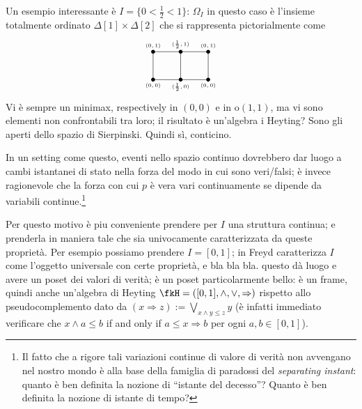 \begin{remark}
  Un esempio interessante è $I=\{0<\frac{1}{2}< 1\}$: $\Omega_I$ in questo caso è l'insieme totalmente ordinato $\Delta[1]\times\Delta[2]$ che si rappresenta pictorialmente come 
  \[\begin{tikzpicture}[xscale=2]
    \foreach \i/\name in {0/0,.5/{\frac{1}{2}},1/0}{
      \foreach \j/\pos in {0/below,1/above}
        \fill (\i,\j) ellipse (1pt and 2pt) node[\pos] {\tiny $(\name,\j)$};
    }
    \draw (0,0) rectangle (1,1);
    \draw (.5,1) -- (.5,0);
    \end{tikzpicture}\]
  Vi è sempre un minimax, respectively in $(0,0)$ e in o$(1,1)$, ma vi sono elementi non confrontabili tra loro; il risultato è un'algebra i Heyting? Sono gli aperti dello spazio di Sierpinski. Quindi sì, conticino.
  
  In un setting come questo, eventi nello spazio continuo dovrebbero dar luogo a cambi istantanei di stato nella forza del modo in cui sono veri/falsi; è invece ragionevole che la forza con cui $p$ è vera vari continuamente se dipende da variabili continue.\footnote{Il fatto che a rigore tali variazioni continue di valore di verità non avvengano nel nostro mondo è alla base della famiglia di paradossi del \emph{separating instant}: quanto è ben definita la nozione di ``istante del decesso''? Quanto è ben definita la nozione di istante di tempo?}

  Per questo motivo è piu conveniente prendere per $I$ una struttura continua; e prenderla in maniera tale che sia univocamente caratterizzata da queste proprietà. Per esempio possiamo prendere $I=[0,1]$; in \cite{} Freyd caratterizza $I$ come l'oggetto universale con certe proprietà, e bla bla bla. questo dà luogo e avere un poset dei valori di verità; è un poset particolarmente bello: è un frame, quindi anche un'algebra di Heyting $\fkH =([0,1],\land,\lor,\Rightarrow)$ rispetto allo pseudocomplemento dato da $(x \Rightarrow z) := \bigvee_{x\land y \le z} y$ (è infatti immediato verificare che $x \land a \le b$ if and only if $a \le x \Rightarrow b$ per ogni $a,b\in [0,1]$).
\end{remark}
